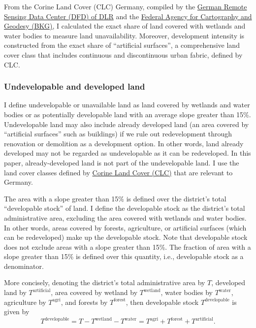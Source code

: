 \documentclass[
  12pt,
]{article}
\begin{document}
From the Corine Land Cover (CLC) Germany, compiled by the
\href{https://www.dlr.de/eoc/en/desktopdefault.aspx/tabid-11882/20871_read-48836}{German
Remote Sensing Data Center (DFD) of DLR} and the
\href{https://www.bkg.bund.de}{Federal Agency for Cartography and
Geodesy (BKG)}, I calculated the exact share of land covered with
wetlands and water bodies to measure land unavailability. Moreover,
development intensity is constructed from the exact share of
``artificial surfaces'', a comprehensive land cover class that includes
continuous and discontinuous urban fabric, defined by CLC.

\subsubsection{Undevelopable and developed land}\label{sec-constraints}

I define undevelopable or unavailable land as land covered by wetlands
and water bodies or as potentially developable land with an average
slope greater than 15\%. Undevelopable land may also include already
developed land (an area covered by ``artificial surfaces'' such as
buildings) if we rule out redevelopment through renovation or demolition
as a development option. In other words, land already developed may not
be regarded as undevelopable as it can be redeveloped. In this paper,
already-developed land is not part of the undevelopable land. I use the
land cover classes defined by
\href{https://land.copernicus.eu/content/corine-land-cover-nomenclature-guidelines/html/}{Corine
Land Cover (CLC)} that are relevant to Germany.

The area with a slope greater than 15\% is defined over the district's
total ``developable stock'' of land. I define the developable stock as
the district's total administrative area, excluding the area covered
with wetlands and water bodies. In other words, areas covered by
forests, agriculture, or artificial surfaces (which can be redeveloped)
make up the developable stock. Note that developable stock does not
exclude areas with a slope greater than 15\%. The fraction of area with
a slope greater than 15\% is defined over this quantity, i.e.,
developable stock as a denominator.

More concisely, denoting the district's total administrative area by
\(T\), developed land by \(T^{\text{artificial}}\), area covered by
wetland by \(T^{\text{wetland}}\), water bodies by \(T^{\text{water}}\),
agriculture by \(T^{\text{agri}}\), and forests by
\(T^{\text{forest}}\), then developable stock \(T^{\text{developable}}\)
is given by \[
T^{\text{developable}} = T - T^{\text{wetland}} - T^{\text{water}} = T^{\text{agri}}  + T^{\text{forest}} + T^{\text{artificial}}.
\]
\end{document}

